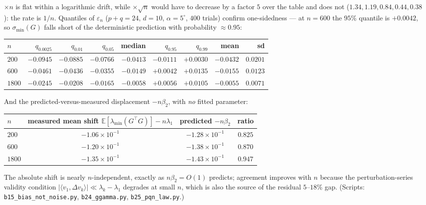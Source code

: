 \documentclass[11pt]{article}
\theoremstyle{remark}
\newcommand{\minr}[1]{\sigma_{\min}(#1)}
\begin{document}
\noindent $\times n$ is flat within a logarithmic drift, while $\times\sqrt n$ would have
to decrease by a factor $5$ over the table and does not ($1.34,1.19,0.84,0.44,0.38$):
the rate is $1/n$. Quantiles of $\varepsilon_n$ ($p+q=24$, $d=10$, $\alpha=5^\circ$,
$400$ trials) confirm one-sidedness --- at $n=600$ the $95\%$ quantile is $+0.0042$, so
$\minr G$ falls short of the deterministic prediction with probability $\approx0.95$:
\begin{center}\begin{tabular}{lrrrrrrrr}
\toprule $n$ & $q_{0.0025}$ & $q_{0.01}$ & $q_{0.05}$ & median & $q_{0.95}$ & $q_{0.99}$ & mean & sd\\
\midrule
$200$  & $-0.0945$ & $-0.0885$ & $-0.0766$ & $-0.0413$ & $-0.0111$ & $+0.0030$ & $-0.0432$ & $0.0201$\\
$600$  & $-0.0461$ & $-0.0436$ & $-0.0355$ & $-0.0149$ & $+0.0042$ & $+0.0135$ & $-0.0155$ & $0.0123$\\
$1800$ & $-0.0245$ & $-0.0208$ & $-0.0165$ & $-0.0058$ & $+0.0056$ & $+0.0105$ & $-0.0055$ & $0.0071$\\
\bottomrule
\end{tabular}\end{center}

\noindent And the predicted-versus-measured displacement $-n\beta_2$, with \emph{no} fitted
parameter:
\begin{center}\begin{tabular}{lccc}
\toprule $n$ & measured mean shift $\mathbb{E}[\lambda_{\min}(G^{\top}G)]-n\lambda_1$ & predicted $-n\beta_2$ & ratio\\
\midrule
$200$  & $-1.06\!\times\!10^{-1}$ & $-1.28\!\times\!10^{-1}$ & $0.825$\\
$600$  & $-1.20\!\times\!10^{-1}$ & $-1.38\!\times\!10^{-1}$ & $0.870$\\
$1800$ & $-1.35\!\times\!10^{-1}$ & $-1.43\!\times\!10^{-1}$ & $0.947$\\
\bottomrule
\end{tabular}\end{center}

\noindent The absolute shift is nearly $n$-independent, exactly as $n\beta_2=O(1)$ predicts;
agreement improves with $n$ because the perturbation-series validity condition
$|\langle v_1,\Delta v_k\rangle|\ll\lambda_k-\lambda_1$ degrades at small $n$, which is
also the source of the residual $5$--$18\%$ gap.
(Scripts: \texttt{b15\_bias\_not\_noise.py}, \texttt{b24\_ggamma.py},
\texttt{b25\_pqn\_law.py}.)
\end{document}
